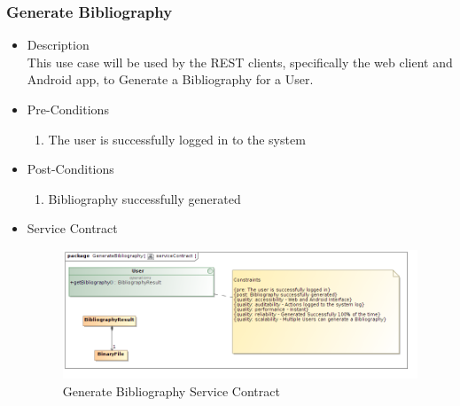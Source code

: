 \documentclass[a4paper,10pt]{article}
\begin{document}
\subsubsection{Generate Bibliography}
	\begin{itemize}
		\item Description\\
			This use case will be used by the REST clients, specifically the web client and Android app, to Generate a Bibliography for a User.
		\item Pre-Conditions
			\begin{enumerate}
				\item The user is successfully logged in to the system
			\end{enumerate}
		\item Post-Conditions
			\begin{enumerate}
				\item Bibliography successfully generated
						
			\end{enumerate}
		\item Service Contract
			\begin{figure}[H]
				\includegraphics[scale=0.5]{generateBibliography}
				\caption{Generate Bibliography Service Contract}
			\end{figure}
	\end{itemize}
\end{document}

